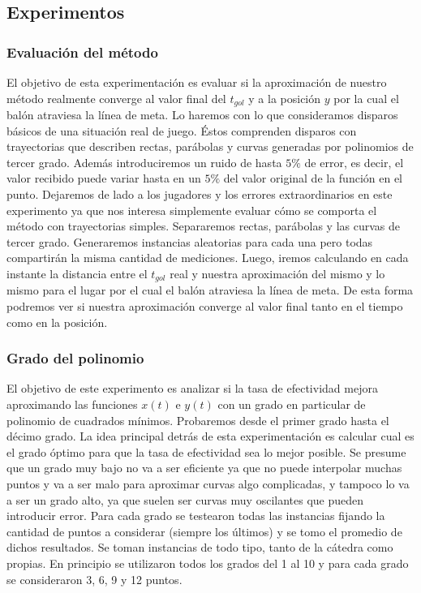 \subsection{Experimentos}

\subsubsection{Evaluación del método}
El objetivo de esta experimentación es evaluar si la aproximación de nuestro método realmente converge al valor final del $t_{gol}$ y a 
la posición $y$ por la cual el balón atraviesa la línea de meta. Lo haremos con lo que consideramos disparos básicos de una situación
real de juego. Éstos comprenden disparos con trayectorias que describen rectas, parábolas y curvas generadas por polinomios de tercer
grado. Además introduciremos un ruido de hasta $5\%$ de error, es decir, el valor recibido puede variar hasta en un $5\%$ del valor
original de la función en el punto. Dejaremos de lado a los jugadores y los errores extraordinarios en este experimento ya que nos interesa
simplemente evaluar cómo se comporta el método con trayectorias simples.
Separaremos rectas, parábolas y las curvas de tercer grado. Generaremos instancias aleatorias para cada una pero todas compartirán la misma
cantidad de mediciones. Luego, iremos calculando en cada instante la distancia entre el $t_{gol}$ real y nuestra aproximación del mismo y lo
mismo para el lugar por el cual el balón atraviesa la línea de meta. De esta forma podremos ver si nuestra aproximación converge al
valor final tanto en el tiempo como en la posición.

\subsubsection{Grado del polinomio}
El objetivo de este experimento es analizar si la tasa de efectividad mejora aproximando las funciones $x(t)$ e $y(t)$ con un grado en 
particular de polinomio de cuadrados mínimos. Probaremos desde el primer grado hasta el décimo grado. La idea principal detrás de esta experimentación es calcular cual es el grado óptimo para que la tasa de efectividad sea lo mejor posible. Se presume que un grado muy bajo no va a ser eficiente ya que no puede interpolar muchas puntos y va a ser malo para aproximar curvas algo complicadas, y tampoco lo va a ser un grado alto, ya que suelen ser curvas muy oscilantes que pueden introducir error. Para cada grado se testearon todas las instancias fijando la cantidad de puntos a considerar (siempre los últimos) y se tomo el promedio de dichos resultados. Se toman instancias de todo tipo, tanto de la cátedra como propias. En principio se utilizaron todos los grados del 1 al 10 y para cada grado se consideraron 3, 6, 9 y 12 puntos.

